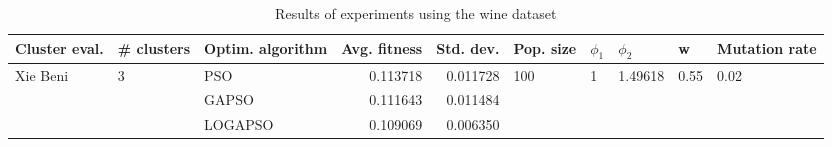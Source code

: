 \begin{table}
\centering
\caption{Results of experiments using the wine dataset}
\begin{tabular}{lllrrlllll}
\toprule
            Cluster eval. &        \# clusters & Optim. algorithm &  Avg. fitness &  Std. dev. &            Pop. size &         $\phi_{1}$ &               $\phi_{2}$ &                     w &         Mutation rate \\
\midrule
\multirow{3}{*}{Xie Beni} & \multirow{3}{*}{3} &              PSO &      0.113718 &   0.011728 & \multirow{3}{*}{100} & \multirow{3}{*}{1} & \multirow{3}{*}{1.49618} & \multirow{3}{*}{0.55} & \multirow{3}{*}{0.02} \\
                          &                    &            GAPSO &      0.111643 &   0.011484 &                      &                    &                          &                       &                       \\
                          &                    &          LOGAPSO &      0.109069 &   0.006350 &                      &                    &                          &                       &                       \\
\bottomrule
\end{tabular}
\end{table}

